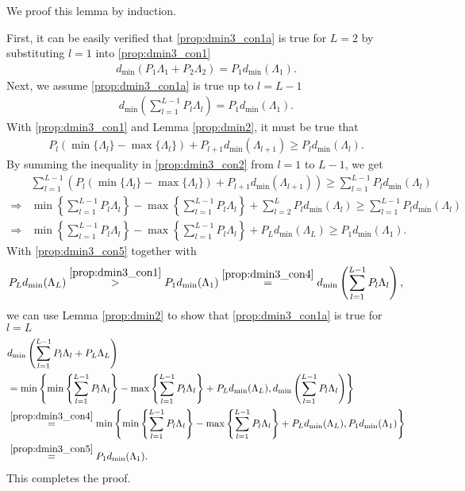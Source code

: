\documentclass[12pt, draftclsnofoot, onecolumn]{IEEEtran}
\theoremstyle{definition}
\begin{document}
\begin{IEEEproof}
We proof this lemma by induction.

First, it can be easily verified that \eqref{prop:dmin3_con1a} is true for $L=2$ by substituting $l=1$ into \eqref{prop:dmin3_con1}
\begin{align}
d_{\min}(P_1\Lambda_1+P_2\Lambda_2)= P_1d_{\min}(\Lambda_1).
\end{align}
Next, we assume \eqref{prop:dmin3_con1a} is true up to $l=L-1$
\begin{align}\label{prop:dmin3_con4}
d_{\min}\left(\sum_{l=1}^{L-1}P_l\Lambda_l\right)  = P_1d_{\min}(\Lambda_1).
\end{align}
With \eqref{prop:dmin3_con1} and Lemma \ref{prop:dmin2}, it must be true that
\begin{align}\label{prop:dmin3_con2}
P_l(\min\{\Lambda_l\}-\max\{\Lambda_l\})+P_{l+1}d_{\min}(\Lambda_{l+1}) \geq P_ld_{\min}(\Lambda_l).
\end{align}
By summing the inequality in \eqref{prop:dmin3_con2} from $l=1$ to $L-1$, we get
\begin{align}
&\sum_{l=1}^{L-1}\left(P_l(\min\{\Lambda_l\}-\max\{\Lambda_l\})+P_{l+1}d_{\min}(\Lambda_{l+1})\right)  \geq \sum_{l=1}^{L-1}P_ld_{\min}(\Lambda_l) \\
\Rightarrow & \min\left\{ \sum_{l=1}^{L-1}P_l\Lambda_l\right\}-\max\left\{ \sum_{l=1}^{L-1}P_l\Lambda_l\right\}+\sum_{l=2}^LP_ld_{\min}(\Lambda_l) \geq \sum_{l=1}^{L-1}P_ld_{\min}(\Lambda_l) \\
\Rightarrow & \min\left\{ \sum_{l=1}^{L-1}P_l\Lambda_l\right\}-\max\left\{ \sum_{l=1}^{L-1}P_l\Lambda_l\right\}+P_Ld_{\min}(\Lambda_L) \geq P_1d_{\min}(\Lambda_1).\label{prop:dmin3_con5}
\end{align}
With \eqref{prop:dmin3_con5} together with
\begin{align}
P_Ld_{\min}(\Lambda_L) \overset{\eqref{prop:dmin3_con1}}{>} P_1d_{\min}(\Lambda_1) \overset{\eqref{prop:dmin3_con4}}{=} d_{\min}\left(\sum_{l=1}^{L-1}P_l\Lambda_l\right),
\end{align}
we can use Lemma \ref{prop:dmin2} to show that \eqref{prop:dmin3_con1a} is true for $l=L$
\begin{align}
&d_{\min}\left(\sum_{l=1}^{L-1}P_l\Lambda_l+P_L\Lambda_L\right) \nonumber \\
&=\min \left\{ \min\left\{ \sum_{l=1}^{L-1}P_l\Lambda_l\right\}-\max\left\{ \sum_{l=1}^{L-1}P_l\Lambda_l\right\}+P_Ld_{\min}(\Lambda_L),d_{\min}\left(\sum_{l=1}^{L-1}P_l\Lambda_l\right)\right\} \nonumber \\
& \overset{\eqref{prop:dmin3_con4}}= \min \left\{ \min\left\{ \sum_{l=1}^{L-1}P_l\Lambda_l\right\}-\max\left\{ \sum_{l=1}^{L-1}P_l\Lambda_l\right\}+P_Ld_{\min}(\Lambda_L),P_1d_{\min}(\Lambda_1)\right\} \nonumber \\
&\overset{\eqref{prop:dmin3_con5}}= P_1d_{\min}(\Lambda_1).
\end{align}
This completes the proof.
\end{IEEEproof}
\end{document}
